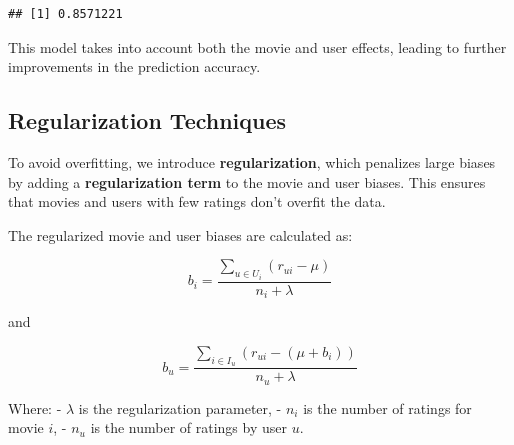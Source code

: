 \documentclass[
]{article}
\begin{document}
\begin{verbatim}
## [1] 0.8571221
\end{verbatim}

This model takes into account both the movie and user effects, leading
to further improvements in the prediction accuracy.

\subsection{Regularization Techniques}\label{regularization-techniques}

To avoid overfitting, we introduce \textbf{regularization}, which
penalizes large biases by adding a \textbf{regularization term} to the
movie and user biases. This ensures that movies and users with few
ratings don't overfit the data.

The regularized movie and user biases are calculated as:

\[
b_i = \frac{\sum_{u \in U_i} (r_{ui} - \mu)}{n_i + \lambda}
\]

and

\[
b_u = \frac{\sum_{i \in I_u} (r_{ui} - (\mu + b_i))}{n_u + \lambda}
\]

Where: - \(\lambda\) is the regularization parameter, - \(n_i\) is the
number of ratings for movie \(i\), - \(n_u\) is the number of ratings by
user \(u\).
\end{document}
